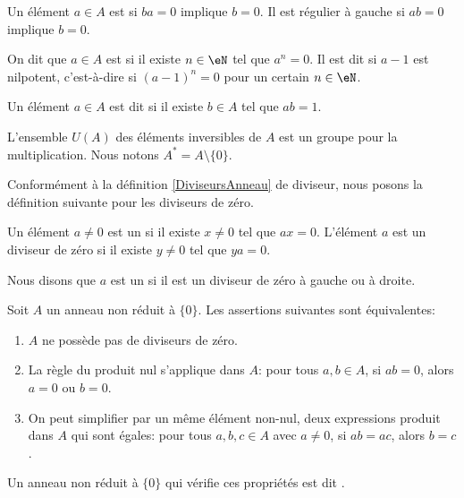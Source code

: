Un élément \( a\in A\) est  si \( ba=0\) implique \( b=0\). Il est régulier à gauche si \( ab=0\) implique \( b=0\).

\begin{definition}  \label{DEFooHRRYooTmbUTH}
	On dit que \( a \in A \) est  si il existe \( n \in \eN \) tel que \( a^n = 0 \). Il est dit  si \( a-1\) est nilpotent, c'est-à-dire si \( (a-1)^n =0\) pour un certain \( n \in \eN \).
\end{definition}

\begin{definition}        \label{DEFooCIHVooAhpJxy}
	Un élément \( a \in A \) est dit  si il existe \( b \in A \) tel que \( ab = 1 \).

	L'ensemble \( U(A)\) des éléments inversibles de \( A\) est un groupe pour la multiplication. Nous notons \( A^*=A\setminus\{ 0 \}\).
\end{definition}

Conformément à la définition \ref{DiviseursAnneau} de diviseur, nous posons la définition suivante pour les diviseurs de zéro.
\begin{definition}
	Un élément \( a\neq 0\) est un  si il existe \( x\neq 0\) tel que \( ax=0\). L'élément \( a\) est un diviseur de zéro  si il existe \( y\neq 0\) tel que \( ya=0\).

	Nous disons que \( a\) est un  si il est un diviseur de zéro à gauche ou à droite.
\end{definition}

\begin{propositionDef}           \label{DEFooTAOPooWDPYmd}
	Soit \( A\) un anneau non réduit à \( \{ 0 \}\). Les assertions suivantes sont équivalentes:
	\begin{enumerate}
		\item       \label{ITEMooMXMKooXMYpkN}
		      \( A\) ne possède pas de diviseurs de zéro.
		\item       \label{ITEMooLAJCooFwxXrV}
		      La règle du produit nul s'applique dans \( A\): pour tous \( a, b \in A \), si \( ab=0\), alors \( a = 0\) ou \( b = 0\).
		\item       \label{ITEMooQNTFooSRrVPK}
		      On peut simplifier par un même élément non-nul, deux expressions produit dans \( A\) qui sont égales: pour tous \( a, b, c \in A \) avec \( a \neq 0 \), si \( ab = ac \), alors \( b = c \).
	\end{enumerate}
	Un anneau non réduit à \( \{ 0 \}\) qui vérifie ces propriétés est dit .
\end{propositionDef}

